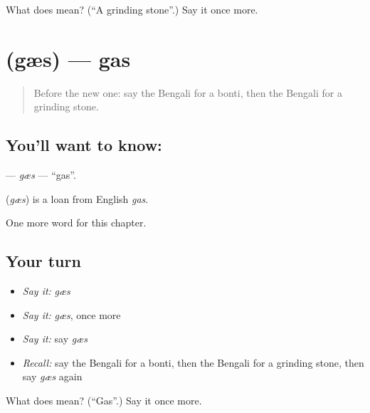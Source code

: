 \begin{tcolorbox}[breakable,colback=teal!4,colframe=teal!35!black,title={Before you move on}]
What does  mean? (\textquotedblleft{}A grinding stone\textquotedblright{}.) Say it once more.
\end{tcolorbox}
\section[\texorpdfstring{\bn{গ্যাস} (gæs)}{গ্যাস (gæs)}]{ (gæs) — gas}

\label{lesson:BN-C175-gs}



\begin{quote}
Before the new one: say the Bengali for a bonti, then the Bengali for a grinding stone.
\end{quote}

\subsection*{You'll want to know: }
\textbf{} — \emph{gæs} — \textquotedblleft{}gas\textquotedblright{}.

\begin{cousinweb}
\textbf{} (\emph{gæs}) is a loan from English \emph{gas}.
\end{cousinweb}

\begin{grammarlens}[title={What you've built}]
One more word for this chapter.
\end{grammarlens}

\subsection*{Your turn}
\begin{itemize}
\raggedright
  \item \emph{Say it:} \emph{gæs}
  \item \emph{Say it:} \emph{gæs}, once more
  \item \emph{Say it:} say \emph{gæs}
  \item \emph{Recall:} say the Bengali for a bonti, then the Bengali for a grinding stone, then say \emph{gæs} again
\end{itemize}

\begin{tcolorbox}[breakable,colback=teal!4,colframe=teal!35!black,title={Before you move on}]
What does  mean? (\textquotedblleft{}Gas\textquotedblright{}.) Say it once more.
\end{tcolorbox}
